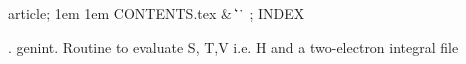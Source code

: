


\Wbegin[;]
{article;}
{1em}
{1em}
{CONTENTS.tex}
{ %
 {\&\WRS}
 {\|}
 {\>\WUC}
 {\>\WUC}
 {\>\WUC}
 {\@}
 {\.\.}
 {\.}
 {}
}
{\M}
{;}
{INDEX}






\FWEBtoc

.  genint. Routine to evaluate S,  T,V i.e. H
           and a two-electron integral file

